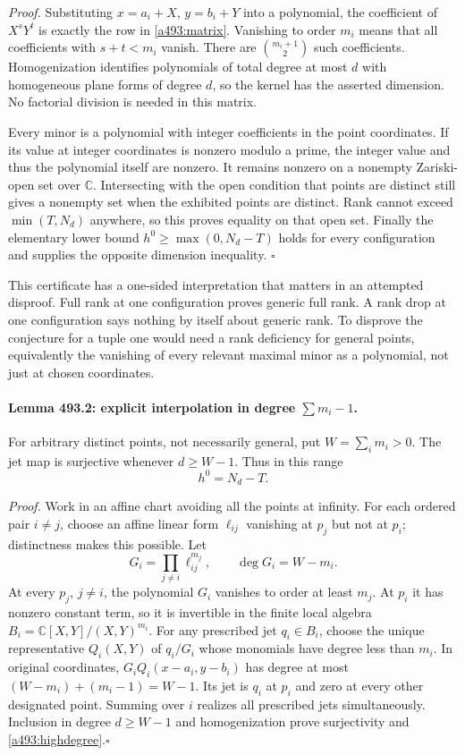 \documentclass[11pt]{article}
\begin{document}
\emph{Proof.} Substituting $x=a_i+X$, $y=b_i+Y$ into a polynomial,
the coefficient of $X^sY^t$ is exactly the row in
\eqref{a493:matrix}. Vanishing to order $m_i$ means that all coefficients
with $s+t<m_i$ vanish. There are $\binom{m_i+1}{2}$ such coefficients.
Homogenization identifies polynomials of total degree at most $d$ with
homogeneous plane forms of degree $d$, so the kernel has the asserted
dimension. No factorial division is needed in this matrix.

Every minor is a polynomial with integer coefficients in the point
coordinates. If its value at integer coordinates is nonzero modulo a prime,
the integer value and thus the polynomial itself are nonzero. It remains
nonzero on a nonempty Zariski-open set over $\mathbb C$. Intersecting with
the open condition that points are distinct still gives a nonempty set
when the exhibited points are distinct. Rank cannot exceed
$\min(T,N_d)$ anywhere, so this proves equality on that open set.
Finally the elementary lower bound $h^0\geq\max(0,N_d-T)$ holds for
every configuration and supplies the opposite dimension inequality.
\hfill$\square$

This certificate has a one-sided interpretation that matters in an attempted
disproof. Full rank at one configuration proves generic full rank. A rank
drop at one configuration says nothing by itself about generic rank. To
disprove the conjecture for a tuple one would need a rank deficiency for
general points, equivalently the vanishing of every relevant maximal minor
as a polynomial, not just at chosen coordinates.

\paragraph{Lemma 493.2: explicit interpolation in degree $\sum m_i-1$.}
For arbitrary distinct points, not necessarily general, put
$W=\sum_i m_i>0$. The jet map is surjective whenever $d\geq W-1$.
Thus in this range
\begin{equation}\label{a493:highdegree}
                         h^0=N_d-T.
\end{equation}

\emph{Proof.} Work in an affine chart avoiding all the points at infinity.
For each ordered pair $i\ne j$, choose an affine linear form
$\ell_{ij}$ vanishing at $p_j$ but not at $p_i$; distinctness makes this
possible. Let
\[
                 G_i=\prod_{j\ne i}\ell_{ij}^{m_j},
                 \qquad \deg G_i=W-m_i.
\]
At every $p_j$, $j\ne i$, the polynomial $G_i$ vanishes to order at
least $m_j$. At $p_i$ it has nonzero constant term, so it is invertible in
the finite local algebra
$B_i=\mathbb C[X,Y]/(X,Y)^{m_i}$. For any prescribed jet $q_i\in B_i$,
choose the unique representative $Q_i(X,Y)$ of $q_i/G_i$ whose monomials
have degree less than $m_i$. In original coordinates,
$G_iQ_i(x-a_i,y-b_i)$ has degree at most
$(W-m_i)+(m_i-1)=W-1$. Its jet is $q_i$ at $p_i$ and zero at every
other designated point. Summing over $i$ realizes all prescribed jets
simultaneously. Inclusion in degree $d\geq W-1$ and homogenization prove
surjectivity and \eqref{a493:highdegree}.\hfill$\square$
\end{document}
